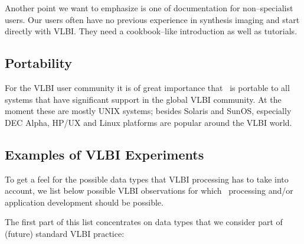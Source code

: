 Another point we want to emphasize is one of documentation for
non--specialist users. Our users often have no previous experience in
synthesis imaging and start directly with VLBI. They need a
cookbook--like introduction as well as tutorials.

\subsection{Portability}

For the VLBI user community it is of great importance that \aipspp\ is
portable to all systems that have significant support in the global
VLBI community. At the moment these are mostly UNIX systems; besides
Solaris and SunOS, especially DEC Alpha, HP/UX and Linux platforms are
popular around the VLBI world.

\subsection{Examples of VLBI Experiments}

To get a feel for the possible data types that VLBI processing has to
take into account, we list below possible VLBI observations for which 
\aipspp\ processing and\slash or application development should be possible.

The first part of this list concentrates on data types that we
consider part of (future) standard VLBI practice:

